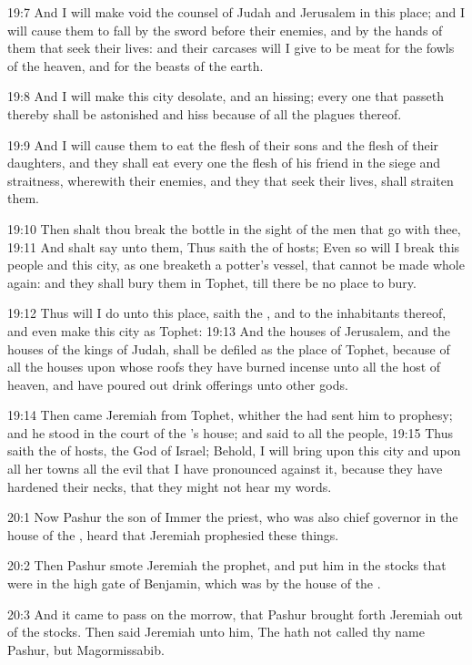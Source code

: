 19:7 And I will make void the counsel of Judah and Jerusalem in this
place; and I will cause them to fall by the sword before their
enemies, and by the hands of them that seek their lives: and their
carcases will I give to be meat for the fowls of the heaven, and for
the beasts of the earth.

19:8 And I will make this city desolate, and an hissing; every one
that passeth thereby shall be astonished and hiss because of all the
plagues thereof.

19:9 And I will cause them to eat the flesh of their sons and the
flesh of their daughters, and they shall eat every one the flesh of
his friend in the siege and straitness, wherewith their enemies, and
they that seek their lives, shall straiten them.

19:10 Then shalt thou break the bottle in the sight of the men that go
with thee, 19:11 And shalt say unto them, Thus saith the \LORD of
hosts; Even so will I break this people and this city, as one breaketh
a potter's vessel, that cannot be made whole again: and they shall
bury them in Tophet, till there be no place to bury.

19:12 Thus will I do unto this place, saith the \LORD, and to the
inhabitants thereof, and even make this city as Tophet: 19:13 And the
houses of Jerusalem, and the houses of the kings of Judah, shall be
defiled as the place of Tophet, because of all the houses upon whose
roofs they have burned incense unto all the host of heaven, and have
poured out drink offerings unto other gods.

19:14 Then came Jeremiah from Tophet, whither the \LORD had sent him to
prophesy; and he stood in the court of the \LORD's house; and said to
all the people, 19:15 Thus saith the \LORD of hosts, the God of Israel;
Behold, I will bring upon this city and upon all her towns all the
evil that I have pronounced against it, because they have hardened
their necks, that they might not hear my words.

20:1 Now Pashur the son of Immer the priest, who was also chief
governor in the house of the \LORD, heard that Jeremiah prophesied
these things.

20:2 Then Pashur smote Jeremiah the prophet, and put him in the stocks
that were in the high gate of Benjamin, which was by the house of the
\LORD.

20:3 And it came to pass on the morrow, that Pashur brought forth
Jeremiah out of the stocks. Then said Jeremiah unto him, The \LORD hath
not called thy name Pashur, but Magormissabib.

